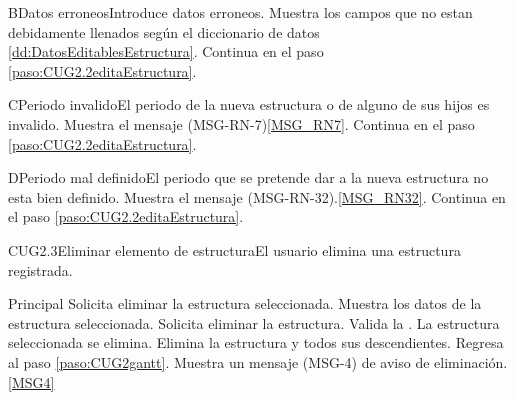 	\begin{UCtrayectoriaA}{B}{Datos erroneos}{Introduce datos erroneos.}
		\UCpaso Muestra los campos que no estan debidamente llenados según el diccionario de datos \ref{dd:DatosEditablesEstructura}.
		\UCpaso Continua en el paso \ref{paso:CUG2.2editaEstructura}.
	\end{UCtrayectoriaA}

	\begin{UCtrayectoriaA}{C}{Periodo invalido}{El periodo de la nueva estructura o de alguno de sus hijos es invalido.}
		\UCpaso Muestra el mensaje (MSG-RN-7)\ref{MSG_RN7}.
		\UCpaso Continua en el paso \ref{paso:CUG2.2editaEstructura}.
	\end{UCtrayectoriaA}

	\begin{UCtrayectoriaA}{D}{Periodo mal definido}{El periodo que se pretende dar a la nueva estructura no esta bien definido.}
		\UCpaso Muestra el mensaje (MSG-RN-32).\ref{MSG_RN32}.
		\UCpaso Continua en el paso \ref{paso:CUG2.2editaEstructura}.
	\end{UCtrayectoriaA}



	\begin{UseCase}{CUG2.3}{Eliminar elemento de estructura}{El usuario elimina una estructura registrada.}
	\end{UseCase}

	\begin{UCtrayectoria}{Principal}
		\UCpaso[\UCactor] Solicita eliminar la estructura seleccionada.
		\UCpaso Muestra los datos de la estructura seleccionada. \label{paso:CUG2.3eliminarEstructura}
		\UCpaso [\UCactor] Solicita eliminar la estructura. 
		\UCpaso Valida la . 
		\UCpaso La estructura seleccionada se elimina.
		\UCpaso Elimina la estructura y todos sus descendientes.
		\UCpaso Regresa al paso \ref{paso:CUG2gantt}.
		\UCpaso Muestra un mensaje (MSG-4) de aviso de eliminación.\ref{MSG4}
	\end{UCtrayectoria}

